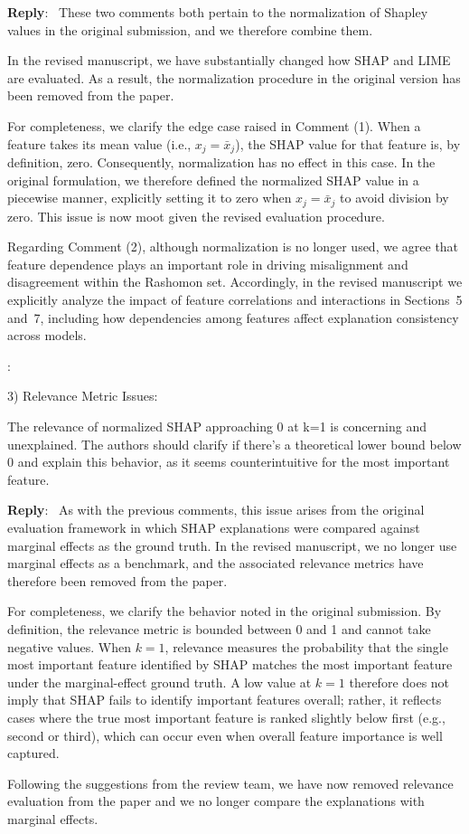 \documentclass[11pt]{article}
\newcounter{se}[section]
\newcounter{reviewer}
\newcounter{point}[reviewer]
\renewcommand{\thepoint}{R\,\thereviewer.\arabic{point}}
\newenvironment{point}{
    \refstepcounter{point} \bigskip \noindent {\textbf{\thepoint}}: \rmfamily \itshape
}{\medskip}
\newenvironment{reply}
 {\par\medskip \noindent \begin{sf}\textbf{Reply}:\ }
 {\medskip \end{sf}}
\begin{document}
\begin{reply}
These two comments both pertain to the normalization of Shapley values in the original submission, and we therefore combine them.

In the revised manuscript, we have substantially changed how SHAP and LIME are evaluated. As a result, the normalization procedure  in the original version has been removed from the paper.

For completeness, we clarify the edge case raised in Comment (1). When a feature takes its mean value (i.e., $x_j = \bar{x}_j$), the SHAP value for that feature is, by definition, zero. Consequently, normalization has no effect in this case. In the original formulation, we therefore defined the normalized SHAP value in a piecewise manner, explicitly setting it to zero when $x_j = \bar{x}_j$ to avoid division by zero. This issue is now moot given the revised evaluation procedure.

Regarding Comment (2), although normalization is no longer used, we agree that feature dependence plays an important role in driving misalignment and disagreement within the Rashomon set. Accordingly, in the revised manuscript we explicitly analyze the impact of feature correlations and interactions in Sections~5 and~7, including how dependencies among features affect explanation consistency across models.
\end{reply}


\begin{point}
3) Relevance Metric Issues:

The relevance of normalized SHAP approaching 0 at k=1 is concerning and unexplained. The authors should clarify if there's a theoretical lower bound below 0 and explain this behavior, as it seems counterintuitive for the most important feature.

\end{point}
\begin{reply}
As with the previous comments, this issue arises from the original evaluation framework in which SHAP explanations were compared against marginal effects as the ground truth. In the revised manuscript, we no longer use marginal effects as a benchmark, and the associated relevance metrics have therefore been removed from the paper.

For completeness, we clarify the behavior noted in the original submission. By definition, the relevance metric is bounded between 0 and 1 and cannot take negative values. When $k=1$, relevance measures the probability that the single most important feature identified by SHAP matches the most important feature under the marginal-effect ground truth. A low value at $k=1$ therefore does not imply that SHAP fails to identify important features overall; rather, it reflects cases where the true most important feature is ranked slightly below first (e.g., second or third), which can occur even when overall feature importance is well captured.  

Following the suggestions from the review team, we have now removed relevance evaluation from the paper and we no longer compare the explanations with marginal effects.
\end{reply}
\end{document}
